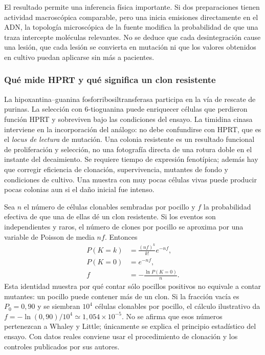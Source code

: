 \documentclass[11pt,a4paper,oneside]{article}
\begin{document}
El resultado permite una inferencia física importante. Si dos preparaciones
tienen actividad macroscópica comparable, pero una inicia emisiones directamente
en el ADN, la topología microscópica de la fuente modifica la probabilidad de
que una traza intercepte moléculas relevantes. No se deduce que cada desintegración
cause una lesión, que cada lesión se convierta en mutación ni que los valores
obtenidos en cultivo puedan aplicarse sin más a pacientes.

\subsubsection{Qué mide HPRT y qué significa un clon resistente}
La hipoxantina--guanina fosforribosiltransferasa participa en la vía de rescate de
purinas. La selección con 6-tioguanina puede enriquecer células que perdieron
función HPRT y sobreviven bajo las condiciones del ensayo. La timidina cinasa
interviene en la incorporación del análogo: no debe confundirse con HPRT,
que es el \emph{locus de lectura} de mutación. Una colonia resistente es un
resultado funcional de proliferación y selección, no una fotografía directa de
una rotura doble en el instante del decaimiento. Se requiere tiempo de expresión
fenotípica; además hay que corregir eficiencia de clonación, supervivencia,
mutantes de fondo y condiciones de cultivo. Una muestra con muy pocas células
vivas puede producir pocas colonias aun si el daño inicial fue intenso.

Sea $n$ el número de células clonables sembradas por pocillo y $f$ la
probabilidad efectiva de que una de ellas dé un clon resistente. Si los
eventos son independientes y raros, el número de clones por pocillo se aproxima
por una variable de Poisson de media $nf$. Entonces
\begin{align}
P(K=k)&=\frac{(nf)^k}{k!}e^{-nf},\\
P(K=0)&=e^{-nf},\\
f&=-\frac{\ln P(K=0)}{n}.
\end{align}
Esta identidad muestra por qué contar sólo pocillos positivos no equivale a
contar mutantes: un pocillo puede contener más de un clon. Si la fracción vacía
es $P_0=0,90$ y se siembran $10^4$ células clonables por pocillo, el cálculo
ilustrativo da $f=-\ln(0,90)/10^4\simeq1,054\times10^{-5}$.
No se afirma que esos números pertenezcan a Whaley y Little; únicamente se
explica el principio estadístico del ensayo. Con datos reales conviene usar
el procedimiento de clonación y los controles publicados por sus autores.
\end{document}
